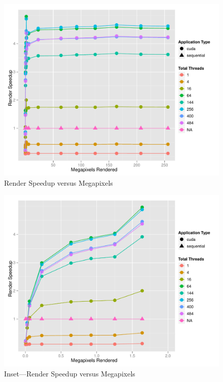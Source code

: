 \documentclass[12pt]{article}
\begin{document}
\begin{figure}
    \caption{Render Speedup versus Megapixels} \label{fig:render_speedup}
    \begin{center}
\includegraphics{cudatrace-005}
    \end{center}
\end{figure}

\begin{figure}
    \caption{Inset---Render Speedup versus Megapixels} \label{fig:render_speedup_zoom}
    \begin{center}
\includegraphics{cudatrace-006}
    \end{center}
\end{figure}
\end{document}

